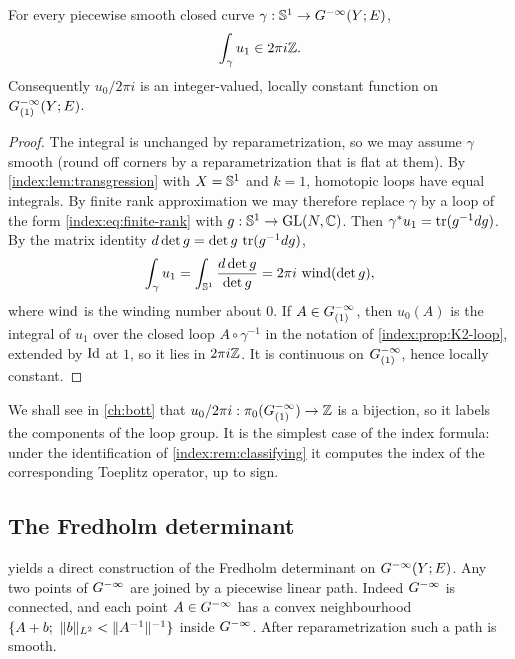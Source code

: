 \begin{proposition}\label{index:prop:integrality}
  For every piecewise smooth closed curve $\gamma:\mathbb{S}^1\to G^{-\infty}(Y;E)$,
  \begin{equation*}
    \int_\gamma u_1\in2\pi i\mathbb{Z}.
  \end{equation*}
  Consequently $u_0/2\pi i$ is an integer-valued, locally constant function
  on $G^{-\infty}_{(1)}(Y;E)$.
\end{proposition}
\begin{proof}
  The integral is unchanged by reparametrization, so we may assume $\gamma$
  smooth (round off corners by a reparametrization that is flat at them). By
  \cref{index:lem:transgression} with $X=\mathbb{S}^1$ and $k=1$, homotopic loops
  have equal integrals. By finite rank approximation we may therefore replace
  $\gamma$ by a loop of the form \eqref{index:eq:finite-rank} with
  $g:\mathbb{S}^1\to\operatorname{GL}(N,\mathbb{C})$. Then $\gamma^*u_1=\operatorname{tr}(g^{-1}dg)$. By the matrix
  identity $d\det g=\det g\,\operatorname{tr}(g^{-1}dg)$,
  \begin{equation*}
    \int_\gamma u_1=\int_{\mathbb{S}^1}\frac{d\det g}{\det g}=2\pi i\,
    \operatorname{wind}(\det g),
  \end{equation*}
  where $\operatorname{wind}$ is the winding number about $0$. If $A\in G^{-\infty}_{(1)}$, then
  $u_0(A)$ is the integral of $u_1$ over the closed loop $A\circ\gamma^{-1}$ in
  the notation of \cref{index:prop:K2-loop}, extended by $\operatorname{Id}$ at $1$, so it
  lies in $2\pi i\mathbb{Z}$. It is continuous on $G^{-\infty}_{(1)}$, hence locally
  constant.
\end{proof}

\begin{remark}\label{index:rem:u0-index}
  We shall see in \cref{ch:bott} that $u_0/2\pi i:\pi_0(G^{-\infty}_{(1)})\to\mathbb{Z}$ is a
  bijection, so it labels the components of the loop group. It is the
  simplest case of the index formula: under the identification of
  \cref{index:rem:classifying} it computes the index of the corresponding
  Toeplitz operator, up to sign.
\end{remark}

\subsection{The Fredholm determinant}
 yields a direct construction of the Fredholm
determinant on $G^{-\infty}(Y;E)$. Any two points of $G^{-\infty}$ are joined by a
piecewise linear path. Indeed $G^{-\infty}$ is connected, and each point
$A\in G^{-\infty}$ has a convex neighbourhood
$\{A+b;\ \lVert b\rVert_{L^2}<\lVert A^{-1}\rVert^{-1}\}$ inside $G^{-\infty}$. After
reparametrization such a path is smooth.

